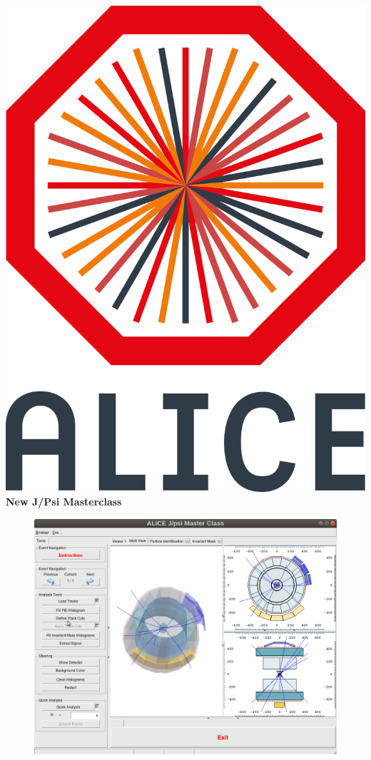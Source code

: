 \documentclass[aspectratio=169,14pt,dvipsnames]{beamer}
\begin{document}
\begin{frame}{\includegraphics[height=0.07\textheight]{2012-Jul-04-4_Color_Logo_CB.png} \hspace{0.2cm}\textbf{New J/Psi Masterclass}}
  \begin{figure}
    \centering
    \includegraphics[height=0.8\textheight]{JPsiClass.png}\hspace{0cm}
  \end{figure}
\end{frame}
\end{document}
